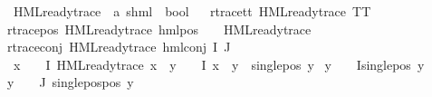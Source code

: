 \begin{isabellebody}
\isanewline
\isanewline
{}\isamarkupfalse%
\ HML{\isacharunderscore}{\kern0pt}ready{\isacharunderscore}{\kern0pt}trace\ {\isacharcolon}{\kern0pt}{\isacharcolon}{\kern0pt}\ {\isachardoublequoteopen}{\isacharparenleft}{\kern0pt}{\isacharprime}{\kern0pt}a{\isacharcomma}{\kern0pt}\ {\isacharprime}{\kern0pt}s{\isacharparenright}{\kern0pt}hml\ {\isasymRightarrow}\ bool{\isachardoublequoteclose}\isanewline
\ \ \isanewline
r{\isacharunderscore}{\kern0pt}trace{\isacharunderscore}{\kern0pt}tt{\isacharcolon}{\kern0pt}\ {\isachardoublequoteopen}HML{\isacharunderscore}{\kern0pt}ready{\isacharunderscore}{\kern0pt}trace\ TT{\isachardoublequoteclose}\ {\isacharbar}{\kern0pt}\isanewline
r{\isacharunderscore}{\kern0pt}trace{\isacharunderscore}{\kern0pt}pos{\isacharcolon}{\kern0pt}\ {\isachardoublequoteopen}HML{\isacharunderscore}{\kern0pt}ready{\isacharunderscore}{\kern0pt}trace\ {\isacharparenleft}{\kern0pt}hml{\isacharunderscore}{\kern0pt}pos\ {\isasymalpha}\ {\isasymphi}{\isacharparenright}{\kern0pt}{\isachardoublequoteclose}\ \ {\isachardoublequoteopen}HML{\isacharunderscore}{\kern0pt}ready{\isacharunderscore}{\kern0pt}trace\ {\isasymphi}{\isachardoublequoteclose}{\isacharbar}{\kern0pt}\isanewline
r{\isacharunderscore}{\kern0pt}trace{\isacharunderscore}{\kern0pt}conj{\isacharcolon}{\kern0pt}\ {\isachardoublequoteopen}HML{\isacharunderscore}{\kern0pt}ready{\isacharunderscore}{\kern0pt}trace\ {\isacharparenleft}{\kern0pt}hml{\isacharunderscore}{\kern0pt}conj\ I\ J\ {\isasymPhi}{\isacharparenright}{\kern0pt}{\isachardoublequoteclose}\ \isanewline
{}\ {\isachardoublequoteopen}{\isacharparenleft}{\kern0pt}{\isasymexists}x\ {\isasymin}\ {\isacharparenleft}{\kern0pt}{\isasymPhi}\ {\isacharbackquote}{\kern0pt}\ I{\isacharparenright}{\kern0pt}{\isachardot}{\kern0pt}\ HML{\isacharunderscore}{\kern0pt}ready{\isacharunderscore}{\kern0pt}trace\ x\ {\isasymand}\ {\isacharparenleft}{\kern0pt}{\isasymforall}y\ {\isasymin}\ {\isacharparenleft}{\kern0pt}{\isasymPhi}\ {\isacharbackquote}{\kern0pt}\ I{\isacharparenright}{\kern0pt}{\isachardot}{\kern0pt}\ x\ {\isasymnoteq}\ y\ {\isasymlongrightarrow}\ single{\isacharunderscore}{\kern0pt}pos\ y{\isacharparenright}{\kern0pt}{\isacharparenright}{\kern0pt}\isanewline
{\isasymor}\ {\isacharparenleft}{\kern0pt}{\isasymforall}y\ {\isasymin}\ {\isacharparenleft}{\kern0pt}{\isasymPhi}\ {\isacharbackquote}{\kern0pt}\ I{\isacharparenright}{\kern0pt}{\isachardot}{\kern0pt}single{\isacharunderscore}{\kern0pt}pos\ y{\isacharparenright}{\kern0pt}{\isachardoublequoteclose}\isanewline
{\isachardoublequoteopen}{\isacharparenleft}{\kern0pt}{\isasymforall}y\ {\isasymin}\ {\isacharparenleft}{\kern0pt}{\isasymPhi}\ {\isacharbackquote}{\kern0pt}\ J{\isacharparenright}{\kern0pt}{\isachardot}{\kern0pt}\ single{\isacharunderscore}{\kern0pt}pos{\isacharunderscore}{\kern0pt}pos\ y{\isacharparenright}{\kern0pt}{\isachardoublequoteclose}\isanewline

\end{isabellebody}
